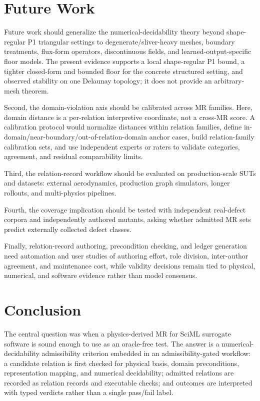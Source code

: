 \documentclass[preprint,12pt,authoryear]{elsarticle}
\begin{document}
\section{Future Work}
\label{sec:future-work}

Future work should generalize the numerical-decidability theory beyond shape-regular P1 triangular settings to degenerate/sliver-heavy meshes, boundary treatments, flux-form operators, discontinuous fields, and learned-output-specific floor models. The present evidence supports a local shape-regular P1 bound, a tighter closed-form and bounded floor for the concrete structured setting, and observed stability on one Delaunay topology; it does not provide an arbitrary-mesh theorem.

Second, the domain-violation axis should be calibrated across MR families. Here, domain distance is a per-relation interpretive coordinate, not a cross-MR score. A calibration protocol would normalize distances within relation families, define in-domain/near-boundary/out-of-relation-domain anchor cases, build relation-family calibration sets, and use independent experts or raters to validate categories, agreement, and residual comparability limits.

Third, the relation-record workflow should be evaluated on production-scale SUTs and datasets: external aerodynamics, production graph simulators, longer rollouts, and multi-physics pipelines.

Fourth, the coverage implication should be tested with independent real-defect corpora and independently authored mutants, asking whether admitted MR sets predict externally collected defect classes.

Finally, relation-record authoring, precondition checking, and ledger generation need automation and user studies of authoring effort, role division, inter-author agreement, and maintenance cost, while validity decisions remain tied to physical, numerical, and software evidence rather than model consensus.

\section{Conclusion}
\label{sec:conclusion}

The central question was when a physics-derived MR for SciML surrogate software is sound enough to use as an oracle-free test. The answer is a numerical-decidability admissibility criterion embedded in an admissibility-gated workflow: a candidate relation is first checked for physical basis, domain preconditions, representation mapping, and numerical decidability; admitted relations are recorded as relation records and executable checks; and outcomes are interpreted with typed verdicts rather than a single pass/fail label.
\end{document}
